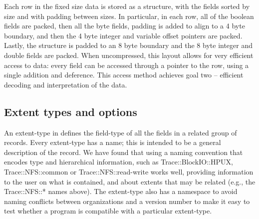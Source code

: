 Each row in the fixed size data is stored as a structure, with the fields sorted by size and with 
padding between sizes.
In particular, in each row, all of the boolean fields are packed, then all
the byte fields, padding is added to align to a 4 byte boundary, and
then the 4 byte integer and variable offset pointers are packed.
Lastly, the structure is padded to an 8 byte boundary and the 8 byte
integer and double fields are packed. When uncompressed, this layout
allows for very efficient access to data: every field can be accessed
through a pointer to the row, using a single addition and deference. 
This access method achieves goal two -- efficient decoding and
interpretation of the data.

\subsection{Extent types and options}\label{sec:extenttype}

An extent-type in \DataSeries{} defines the field-type of all the fields in a
related group of records.  Every extent-type has a name; this is
intended to be a general description of the record.  We have found that
using a naming convention that encodes type and hierarchical information,
such as 
Trace::BlockIO::HPUX, 
Trace::NFS::common or
Trace::NFS::read-write
works well, providing information to the user on what is contained, and 
about extents that may be related (e.g., the Trace::NFS::* names above). 
The extent-type also has a namespace to avoid naming conflicts between
organizations and a version number to make it easy to test whether
a program is compatible with a particular extent-type.


